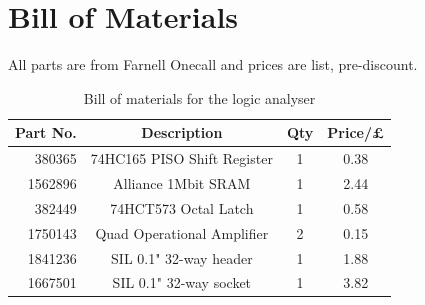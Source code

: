 \documentclass[11pt]{article}
\begin{document}
\section{Bill of Materials}
    All parts are from Farnell Onecall and prices are list, pre-discount.

    \begin{table}
    \begin{center}
    \begin{tabular}{|r|c|c|c|}
        \hline \textbf{Part No.} & \textbf{Description} & \textbf{Qty} & \textbf{Price/£ }  \\
        \hline 380365 & 74HC165 PISO Shift Register & 1 & 0.38 \\
        \hline 1562896 & Alliance 1Mbit SRAM & 1 & 2.44 \\
         \hline 382449 & 74HCT573 Octal Latch & 1 & 0.58 \\
        \hline 1750143 & Quad Operational Amplifier & 2 & 0.15 \\
        \hline 1841236 & SIL 0.1" 32-way header & 1 & 1.88 \\
        \hline 1667501 & SIL 0.1" 32-way socket & 1 & 3.82 \\
        \hline
    \end{tabular}
    \end{center}
    \caption{Bill of materials for the logic analyser}
    \label{fig:myt}
    \end{table}
	
\end{document}
